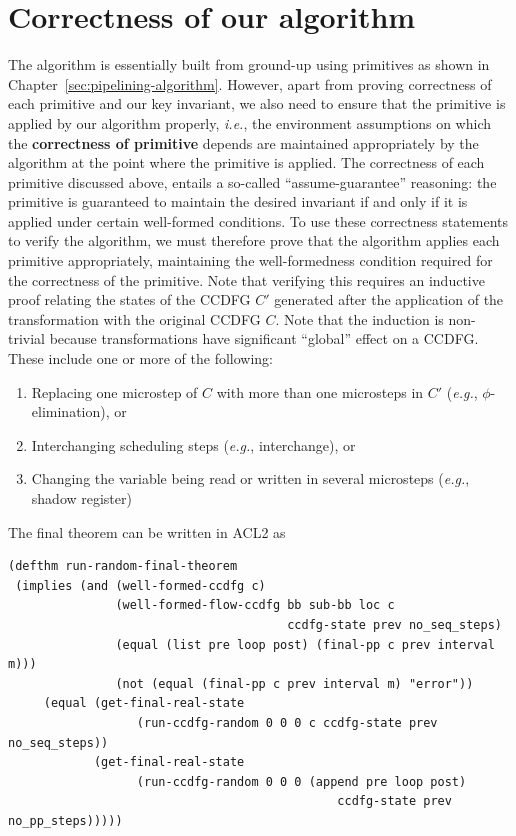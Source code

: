 \section{Correctness of our algorithm}

The algorithm is essentially built from ground-up using primitives
as shown in Chapter~\ref{sec:pipelining-algorithm}. However, 
apart from proving correctness of each primitive and our key 
invariant, we also need to ensure that the primitive is applied by 
our algorithm properly, {\em i.e.}, the environment
assumptions on which the {\bf correctness of primitive}
depends are maintained appropriately by the algorithm at
the point where the primitive is applied. 
The correctness of each primitive discussed above, entails a
so-called ``assume-guarantee'' reasoning: the primitive is
guaranteed to maintain the desired invariant if and only if
it is applied under certain well-formed conditions.  To use
these correctness statements to verify the algorithm, we
must therefore prove that the algorithm applies each
primitive appropriately, maintaining the well-formedness
condition required for the correctness of the primitive.
Note that verifying this requires an inductive proof
relating the states of the CCDFG $C'$ generated after the
application of the transformation with the original CCDFG
$C$. Note that the induction is non-trivial because
transformations have significant ``global'' effect on a
CCDFG. These include one or more of the following:

\begin{enumerate}
\item Replacing one microstep of $C$ with more than one
  microsteps in $C'$ ({\em e.g.}, $\phi$-elimination), or
\item Interchanging scheduling steps ({\em e.g.},
  interchange), or
\item Changing the variable being read or written in several
  microsteps ({\em e.g.}, shadow register)
\end{enumerate}

The final theorem can be written in ACL2 as 
\small
\begin{verbatim}
(defthm run-random-final-theorem
 (implies (and (well-formed-ccdfg c)
               (well-formed-flow-ccdfg bb sub-bb loc c 
                                       ccdfg-state prev no_seq_steps)
               (equal (list pre loop post) (final-pp c prev interval m)))
               (not (equal (final-pp c prev interval m) "error"))
     (equal (get-final-real-state 
                  (run-ccdfg-random 0 0 0 c ccdfg-state prev no_seq_steps))
            (get-final-real-state 
                  (run-ccdfg-random 0 0 0 (append pre loop post) 
                                              ccdfg-state prev no_pp_steps)))))
\end{verbatim}
\normalsize

